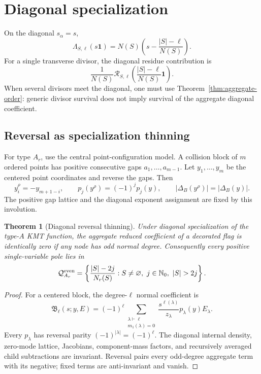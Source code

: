 \documentclass[11pt]{article}
\newtheorem{theorem}{Theorem}[section]
\renewcommand{\boxed}[1]{#1}
\newcommand{\Nzero}{\mathbb N_0}
\newcommand{\cR}{\mathcal R}
\newcommand{\bfone}{\mathbf 1}
\begin{document}
\section{Diagonal specialization}

On the diagonal \(s_\alpha=s\),
\[
 \Lambda_{S,\ell}(s\bfone)
 =N(S)\left(s-\frac{|S|-\ell}{N(S)}\right).
\]
For a single transverse divisor, the diagonal residue contribution is
\[
 \frac1{N(S)}
 \cR_{S,\ell}\!\left(\frac{|S|-\ell}{N(S)}\bfone\right).
\]
When several divisors meet the diagonal, one must use
Theorem~\ref{thm:aggregate-order}: generic divisor survival does not
imply survival of the aggregate diagonal coefficient.

\subsection{Reversal as specialization thinning}

For type \(A_r\), use the central point-configuration model.  A
collision block of \(m\) ordered points has positive consecutive gaps
\(a_1,\ldots,a_{m-1}\).  Let \(y_1,\ldots,y_m\) be the centered point
coordinates and reverse the gaps.  Then
\[
 y_i^\rho=-y_{m+1-i},\qquad
 p_j(y^\rho)=(-1)^jp_j(y),\qquad
 |\Delta_B(y^\rho)|=|\Delta_B(y)|.
\]
The positive gap lattice and the diagonal exponent assignment are fixed
by this involution.

\begin{theorem}[Diagonal reversal thinning]
\label{thm:diagonal-parity}
Under diagonal specialization of the type-\(A\) KMT function, the
aggregate reduced coefficient of a decorated flag is identically zero
if any node has odd normal degree.  Consequently every positive
single-variable pole lies in
\[
 \boxed{
 \mathcal Q_{A_r}^{\rm even}
 =\left\{
 \frac{|S|-2j}{N_r(S)}:
 S\ne\varnothing,\ j\in\Nzero,\ |S|>2j
 \right\}.}
\]
\end{theorem}

\begin{proof}
For a centered block, the degree-\(\ell\) normal coefficient is
\[
 \mathfrak B_\ell(s;y,E)
 =(-1)^\ell
 \sum_{\substack{\lambda\vdash\ell\\m_1(\lambda)=0}}
 \frac{s^{\ell(\lambda)}}{z_\lambda}p_\lambda(y)E_\lambda.
\]
Every \(p_\lambda\) has reversal parity
\((-1)^{|\lambda|}=(-1)^\ell\).  The diagonal internal density,
zero-mode lattice, Jacobians, component-mass factors, and recursively
averaged child subtractions are invariant.  Reversal pairs every
odd-degree aggregate term with its negative; fixed terms are
anti-invariant and vanish.
\end{proof}
\end{document}
